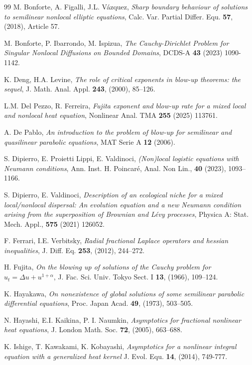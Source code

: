 \documentclass[11pt,a4paper,reqno]{amsart}
\theoremstyle{definition}
\theoremstyle{plain}
\numberwithin{equation}{section}
\begin{document}
\begin{thebibliography}{99}
M. Bonforte, A. Figalli, J.L. V\'{a}zquez,
{\em Sharp boundary behaviour of solutions to semilinear nonlocal elliptic equations},
Calc. Var.  Partial Differ. Equ. {\bf 57}, (2018), Article 57.

  M. Bonforte, P. Ibarrondo, M. Ispizua, {\it The Cauchy-Dirichlet Problem for Singular Nonlocal Diffusions
on Bounded Domains}, DCDS-A {\bf 43} (2023) 1090-1142.






  K. Deng, H.A. Levine,
{\em The role of critical exponents in blow-up theorems: the sequel},
J. Math. Anal. Appl. \textbf{243}, (2000), 85--126.

 L.M. Del Pezzo, R. Ferreira, {\it Fujita exponent and blow-up rate for a mixed local and nonlocal
heat equation}, Nonlinear Anal. TMA {\bf 255} (2025) 113761.

 A. De Pablo, {\it An introduction to the problem of blow-up for semilinear and quasilinear
parabolic equations}, MAT Serie A \textbf{12} (2006).

 S. Dipierro, E. Proietti Lippi, E. Valdinoci, {\it (Non)local logistic equations with Neumann conditions}, Ann. Inst. H. Poincar\'e, Anal. Non Lin., {\bf 40} (2023), 1093--1166.


 S. Dipierro, E. Valdinoci, {\it
Description of an ecological niche for a mixed local/nonlocal dispersal: An evolution equation and a new Neumann condition arising from the superposition of Brownian and Lévy processes},
Physica A: Stat. Mech. Appl., {\bf 575} (2021) 126052.


F. Ferrari, I.E. Verbitsky,
{\it Radial fractional Laplace operators and hessian inequalities},
J. Diff. Eq. {\bf 253}, (2012), 244--272.

 H. Fujita,
{\em On the blowing up of solutions of the Cauchy problem for $u_t=\Delta u+u^{1+\alpha}$},
 J. Fac. Sci. Univ. Tokyo Sect. I \textbf{13}, (1966), 109--124.

 K. Hayakawa, {\em On nonexistence of global solutions of some semilinear parabolic differential equations}, Proc. Japan Acad. \textbf{49}, (1973), 503--505.

 N. Hayashi, E.I. Kaikina, P. I. Naumkin, {\it  Asymptotics for fractional nonlinear heat equations}, J. London Math. Soc. {\bf 72}, (2005), 663--688.

 K. Ishige, T. Kawakami, K. Kobayashi, {\it  Asymptotics for a nonlinear integral equation with a generalized heat kernel} J. Evol. Equ. {\bf 14}, (2014), 749-777.



\end{thebibliography}
\end{document}
